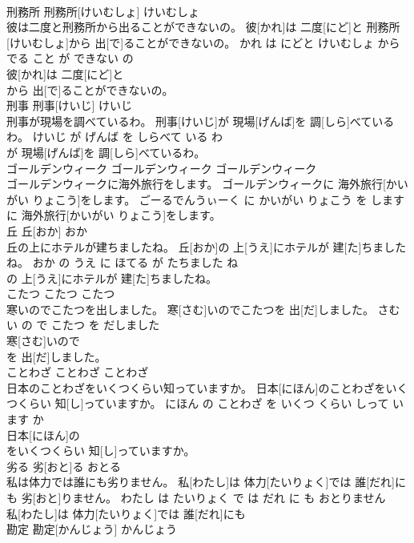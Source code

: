 \documentclass[8pt]{extreport}
\begin{document}
\begin{CJK}{UTF8}{min}
\\	刑務所	刑務所[けいむしょ]	けいむしょ	
\\	彼は二度と刑務所から出ることができないの。	彼[かれ]は 二度[にど]と 刑務所[けいむしょ]から 出[で]ることができないの。	かれ は にどと けいむしょ から でる こと が できない の	
\\	彼[かれ]は 二度[にど]と
\\	から 出[で]ることができないの。			
\\	刑事	刑事[けいじ]	けいじ	
\\	刑事が現場を調べているわ。	刑事[けいじ]が 現場[げんば]を 調[しら]べているわ。	けいじ が げんば を しらべて いる わ	
\\	が 現場[げんば]を 調[しら]べているわ。			
\\	ゴールデンウィーク	ゴールデンウィーク	ゴールデンウィーク	
\\	ゴールデンウィークに海外旅行をします。	ゴールデンウィークに 海外旅行[かいがい りょこう]をします。	ごーるでんうぃーく に かいがい りょこう を します	
\\	に 海外旅行[かいがい りょこう]をします。			
\\	丘	丘[おか]	おか	
\\	丘の上にホテルが建ちましたね。	丘[おか]の 上[うえ]にホテルが 建[た]ちましたね。	おか の うえ に ほてる が たちました ね	
\\	の 上[うえ]にホテルが 建[た]ちましたね。			
\\	こたつ	こたつ	こたつ	
\\	寒いのでこたつを出しました。	寒[さむ]いのでこたつを 出[だ]しました。	さむい の で こたつ を だしました	
\\	寒[さむ]いので
\\	を 出[だ]しました。			
\\	ことわざ	ことわざ	ことわざ	
\\	日本のことわざをいくつくらい知っていますか。	日本[にほん]のことわざをいくつくらい 知[し]っていますか。	にほん の ことわざ を いくつ くらい しって います か	
\\	日本[にほん]の
\\	をいくつくらい 知[し]っていますか。			
\\	劣る	劣[おと]る	おとる	
\\	私は体力では誰にも劣りません。	私[わたし]は 体力[たいりょく]では 誰[だれ]にも 劣[おと]りません。	わたし は たいりょく で は だれ に も おとりません	
\\	私[わたし]は 体力[たいりょく]では 誰[だれ]にも
\\	勘定	勘定[かんじょう]	かんじょう	

\end{CJK}
\end{document}
